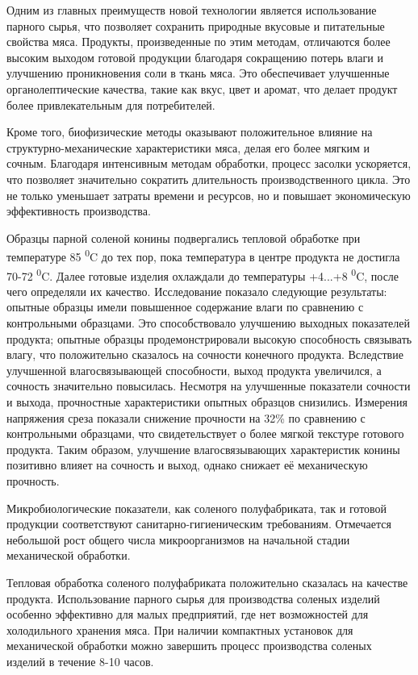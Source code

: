 Одним из главных преимуществ новой технологии является использование
парного сырья, что позволяет сохранить природные вкусовые и питательные
свойства мяса. Продукты, произведенные по этим методам, отличаются более
высоким выходом готовой продукции благодаря сокращению потерь влаги и
улучшению проникновения соли в ткань мяса. Это обеспечивает улучшенные
органолептические качества, такие как вкус, цвет и аромат, что делает
продукт более привлекательным для потребителей.

Кроме того, биофизические методы оказывают положительное влияние на
структурно-механические характеристики мяса, делая его более мягким и
сочным. Благодаря интенсивным методам обработки, процесс засолки
ускоряется, что позволяет значительно сократить длительность
производственного цикла. Это не только уменьшает затраты времени и
ресурсов, но и повышает экономическую эффективность производства.

Образцы парной соленой конины подвергались тепловой обработке при
температуре 85 \textsuperscript{0}C до тех пор, пока температура в
центре продукта не достигла 70-72 \textsuperscript{0}C. Далее готовые
изделия охлаждали до температуры +4...+8 \textsuperscript{0}C, после
чего определяли их качество. Исследование показало следующие результаты:
опытные образцы имели повышенное содержание влаги по сравнению с
контрольными образцами. Это способствовало улучшению выходных
показателей продукта; опытные образцы продемонстрировали высокую
способность связывать влагу, что положительно сказалось на сочности
конечного продукта. Вследствие улучшенной влагосвязывающей способности,
выход продукта увеличился, а сочность значительно повысилась. Несмотря
на улучшенные показатели сочности и выхода, прочностные характеристики
опытных образцов снизились. Измерения напряжения среза показали снижение
прочности на 32\% по сравнению с контрольными образцами, что
свидетельствует о более мягкой текстуре готового продукта. Таким
образом, улучшение влагосвязывающих характеристик конины позитивно
влияет на сочность и выход, однако снижает её механическую прочность.

Микробиологические показатели, как соленого полуфабриката, так и готовой
продукции соответствуют санитарно-гигиеническим требованиям. Отмечается
небольшой рост общего числа микроорганизмов на начальной стадии
механической обработки.

Тепловая обработка соленого полуфабриката положительно сказалась на
качестве продукта. Использование парного сырья для производства соленых
изделий особенно эффективно для малых предприятий, где нет возможностей
для холодильного хранения мяса. При наличии компактных установок для
механической обработки можно завершить процесс производства соленых
изделий в течение 8-10 часов.

